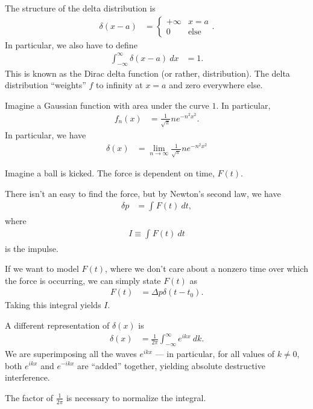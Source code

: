 \documentclass[10pt]{mypackage}
\begin{document}
The structure of the delta distribution is
\begin{align*}
  \delta\!\left(x-a\right) &= \begin{cases}
    +\infty & x=a\\
    0 & \text{else}
  \end{cases}.
\end{align*}
In particular, we also have to define
\begin{align*}
  \int_{-\infty}^{\infty} \delta\!\left(x-a\right)\:dx &= 1.
\end{align*}
This is known as the Dirac delta function (or rather, distribution). The delta distribution ``weights'' $f$ to infinity at $x=a$ and zero everywhere else.
\begin{example}
  Imagine a Gaussian function with area under the curve $1$. In particular,
  \begin{align*}
    f_n(x) &= \frac{1}{\sqrt{\pi}}ne^{-n^2x^2}.
  \end{align*}
  In particular, we have
  \begin{align*}
    \delta(x) &= \lim_{n\rightarrow\infty}\frac{1}{\sqrt{\pi}}ne^{-n^2x^2}
  \end{align*}
\end{example}
\begin{example}
  Imagine a ball is kicked. The force is dependent on time, $F(t)$.\newline

  There isn't an easy to find the force, but by Newton's second law, we have
  \begin{align*}
    \delta p &= \int_{}^{} F(t)\:dt,
  \end{align*}
  where
  \begin{align*}
    I \equiv \int_{}^{} F(t)\:dt
  \end{align*}
  is the impulse.\newline

  If we want to model $F(t)$, where we don't care about a nonzero time over which the force is occurring, we can simply state $F(t)$ as
  \begin{align*}
    F(t) &= \Delta p \delta\!\left(t-t_0\right).
  \end{align*}
  Taking this integral yields $I$.
\end{example}
\begin{example}
A different representation of $\delta(x)$ is
\begin{align*}
  \delta(x) &= \frac{1}{2\pi}\int_{-\infty}^{\infty} e^{ikx}\:dk.
\end{align*}
We are superimposing all the waves $e^{ikx}$ --- in particular, for all values of $k\neq 0$, both $e^{ikx}$ and $e^{-ikx}$ are ``added'' together, yielding absolute destructive interference.\newline

The factor of $\frac{1}{2\pi}$ is necessary to normalize the integral.
\end{example}
\end{document}
